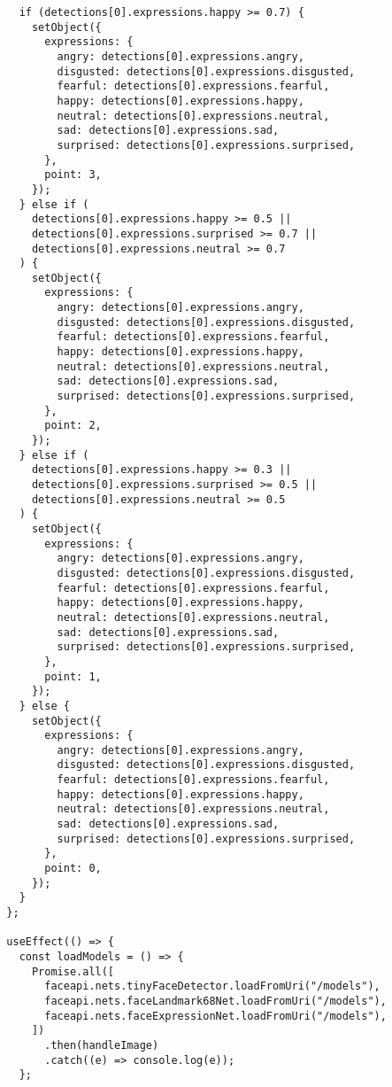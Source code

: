 \begin{verbatim}
    if (detections[0].expressions.happy >= 0.7) {
      setObject({
        expressions: {
          angry: detections[0].expressions.angry,
          disgusted: detections[0].expressions.disgusted,
          fearful: detections[0].expressions.fearful,
          happy: detections[0].expressions.happy,
          neutral: detections[0].expressions.neutral,
          sad: detections[0].expressions.sad,
          surprised: detections[0].expressions.surprised,
        },
        point: 3,
      });
    } else if (
      detections[0].expressions.happy >= 0.5 ||
      detections[0].expressions.surprised >= 0.7 ||
      detections[0].expressions.neutral >= 0.7
    ) {
      setObject({
        expressions: {
          angry: detections[0].expressions.angry,
          disgusted: detections[0].expressions.disgusted,
          fearful: detections[0].expressions.fearful,
          happy: detections[0].expressions.happy,
          neutral: detections[0].expressions.neutral,
          sad: detections[0].expressions.sad,
          surprised: detections[0].expressions.surprised,
        },
        point: 2,
      });
    } else if (
      detections[0].expressions.happy >= 0.3 ||
      detections[0].expressions.surprised >= 0.5 ||
      detections[0].expressions.neutral >= 0.5
    ) {
      setObject({
        expressions: {
          angry: detections[0].expressions.angry,
          disgusted: detections[0].expressions.disgusted,
          fearful: detections[0].expressions.fearful,
          happy: detections[0].expressions.happy,
          neutral: detections[0].expressions.neutral,
          sad: detections[0].expressions.sad,
          surprised: detections[0].expressions.surprised,
        },
        point: 1,
      });
    } else {
      setObject({
        expressions: {
          angry: detections[0].expressions.angry,
          disgusted: detections[0].expressions.disgusted,
          fearful: detections[0].expressions.fearful,
          happy: detections[0].expressions.happy,
          neutral: detections[0].expressions.neutral,
          sad: detections[0].expressions.sad,
          surprised: detections[0].expressions.surprised,
        },
        point: 0,
      });
    }
  };

  useEffect(() => {
    const loadModels = () => {
      Promise.all([
        faceapi.nets.tinyFaceDetector.loadFromUri("/models"),
        faceapi.nets.faceLandmark68Net.loadFromUri("/models"),
        faceapi.nets.faceExpressionNet.loadFromUri("/models"),
      ])
        .then(handleImage)
        .catch((e) => console.log(e));
    };


\end{verbatim}
